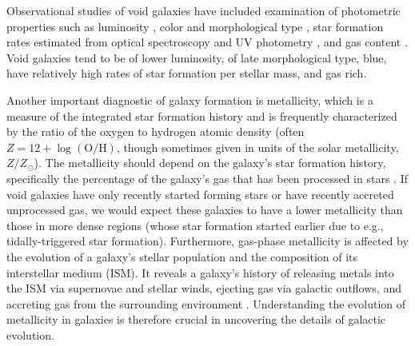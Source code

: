 
Observational studies of void galaxies have included examination of photometric 
properties such as luminosity \citep{Hoyle05, Croton05, Moorman15}, color and 
morphological type \citep{Grogin00, Rojas04, Patiri06, Park07, 
vonBendaBeckmann08, Hoyle12}, star formation rates estimated from optical 
spectroscopy and UV photometry \citep{Rojas05, Moorman15, Beygu16}, and gas 
content \citep{Kreckel12, Moorman16, Jones16}.  Void galaxies tend to be of 
lower luminosity, of late morphological type, blue, have relatively high rates 
of star formation per stellar mass, and gas rich.


Another important diagnostic of galaxy formation is metallicity, which is a 
measure of the integrated star formation history and is frequently characterized 
by the ratio of the oxygen to hydrogen atomic density (often 
$Z = 12 + \log (\text{O}/\text{H})$, though sometimes given in units of the 
solar metallicity, $Z/Z_{\odot}$).  The metallicity should depend on the 
galaxy's star formation history, specifically the percentage of the galaxy's gas 
that has been processed in stars \citep{Guseva09}.  If void galaxies have only 
recently started forming stars or have recently accreted unprocessed gas, we 
would expect these galaxies to have a lower metallicity than those in more dense 
regions (whose star formation started earlier due to e.g., tidally-triggered 
star formation).  Furthermore, gas-phase metallicity is affected by the 
evolution of a galaxy's stellar population and the composition of its 
interstellar medium (ISM).  It reveals a galaxy's history of releasing metals 
into the ISM via supernovae and stellar winds, ejecting gas via galactic 
outflows, and accreting gas from the surrounding environment 
\citep[see, e.g.,][and references therein]{Cooper08,Cybulski14,Hirschmann14}.  
Understanding the evolution of metallicity in galaxies is therefore crucial in 
uncovering the details of galactic evolution.


